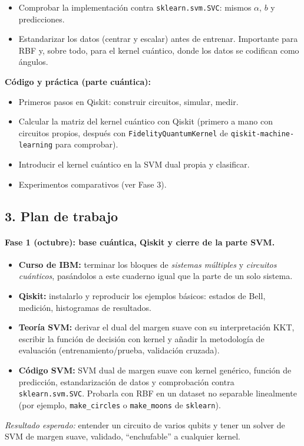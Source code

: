 \documentclass[12pt, a4paper]{article}
\begin{document}
\begin{tcolorbox}[colback=red!5!white,colframe=red!60!black,title=\textbf{Falta}]
\begin{itemize}
    \item Comprobar la implementación contra \texttt{sklearn.svm.SVC}: mismos $\alpha$, $b$ y predicciones.
    \item Estandarizar los datos (centrar y escalar) antes de entrenar. Importante para RBF y, sobre todo, para el kernel cuántico, donde los datos se codifican como ángulos.
\end{itemize}
\textbf{Código y práctica (parte cuántica):}
\begin{itemize}
    \item Primeros pasos en Qiskit: construir circuitos, simular, medir.
    \item Calcular la matriz del kernel cuántico con Qiskit (primero a mano con circuitos propios, después con \texttt{FidelityQuantumKernel} de \texttt{qiskit-machine-learning} para comprobar).
    \item Introducir el kernel cuántico en la SVM dual propia y clasificar.
    \item Experimentos comparativos (ver Fase 3).
\end{itemize}
\end{tcolorbox}

\subsection*{3. Plan de trabajo}

\paragraph{Fase 1 (octubre): base cuántica, Qiskit y cierre de la parte SVM.}\mbox{}
\begin{itemize}
    \item \textbf{Curso de IBM:} terminar los bloques de \textit{sistemas múltiples} y \textit{circuitos cuánticos}, pasándolos a este cuaderno igual que la parte de un solo sistema.
    \item \textbf{Qiskit:} instalarlo y reproducir los ejemplos básicos: estados de Bell, medición, histogramas de resultados.
    \item \textbf{Teoría SVM:} derivar el dual del margen suave con su interpretación KKT, escribir la función de decisión con kernel y añadir la metodología de evaluación (entrenamiento/prueba, validación cruzada).
    \item \textbf{Código SVM:} SVM dual de margen suave con kernel genérico, función de predicción, estandarización de datos y comprobación contra \texttt{sklearn.svm.SVC}. Probarla con RBF en un dataset no separable linealmente (por ejemplo, \texttt{make\_circles} o \texttt{make\_moons} de \texttt{sklearn}).
\end{itemize}
\textit{Resultado esperado:} entender un circuito de varios qubits y tener un solver de SVM de margen suave, validado, ``enchufable'' a cualquier kernel.
\end{document}

